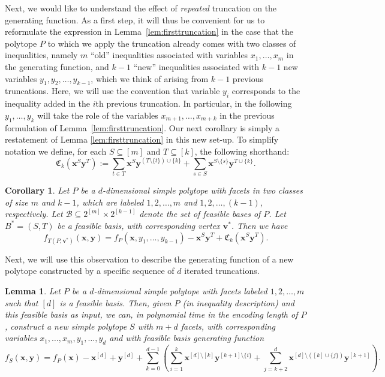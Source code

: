 \documentclass[centering,11pt,reqno]{amsart}
\newtheorem{lem}[theorem]{Lemma}
\newtheorem{cor}[theorem]{Corollary}
\theoremstyle{definition}
\begin{document}
Next, we would like to understand the effect of \emph{repeated} truncation on the generating function. As a first step, it will thus be convenient for us to reformulate the expression in Lemma~\ref{lem:firsttruncation} in the case that the polytope $P$ to which we apply the truncation already comes with two classes of inequalities, namely $m$ ``old'' inequalities associated with variables $x_1,\ldots,x_m$ in the generating function, and $k-1$ ``new'' inequalities associated with $k-1$ new variables $y_{1}, y_{2}, \dots, y_{k-1}$, which we think of arising from $k-1$ previous truncations. Here, we will use the convention that variable $y_{i}$ corresponds to the inequality added in the $i$th previous truncation. In particular, in the following $y_1,\ldots,y_k$ will take the role of the variables $x_{m+1},\ldots,x_{m+k}$ in the previous formulation of Lemma~\ref{lem:firsttruncation}. Our next corollary is simply a restatement of Lemma \ref{lem:firsttruncation} in this new set-up. To simplify notation we define, for each $S\subseteq [m]$ and $T\subseteq [k]$, the following shorthand: $$\mathfrak{C}_{k}(\mathbf{x}^{S}\mathbf{y}^{T}) :=\sum_{t \in T} \mathbf{x}^{S} \mathbf{y}^{(T \setminus \{t\} )\cup \{k\}}+\sum_{s \in S} \mathbf{x}^{S \setminus \{s\}} \mathbf{y}^{T \cup \{k\}}.$$

\begin{cor}\label{cor:truncateys}
Let $P$ be a $d$-dimensional simple polytope with facets in two classes of size $m$ and $k-1$, which are labeled $1,2,\dots,m$ and $1,2,\dots,(k-1)$, respectively. Let $\mathcal{B} \subseteq 2^{[m]} \times 2^{[k-1]}$ denote the set of feasible bases of $P$. Let $B^{\ast} = (S,T)$ be a feasible basis, with corresponding vertex $\mathbf{v}^\ast$. Then we have
\[f_{T(P,\mathbf{v}^\ast)}(\mathbf{x},\mathbf{y}) =  %
f_P(\mathbf{x},y_1,\ldots,y_{k-1})-\mathbf{x}^S\mathbf{y}^T + \mathfrak{C}_k(\mathbf{x}^{S}\mathbf{y}^{T}).\]
\end{cor}

Next, we will use this observation to describe the generating function of a new polytope constructed by a specific sequence of $d$ iterated truncations.

\begin{lem}\label{lem:function}
Let $P$ be a $d$-dimensional simple polytope with facets labeled $1, 2,\dots, m$ such that $[d]$ is a feasible basis. Then, given $P$ (in inequality description) and this feasible basis as input, we can, in polynomial time in the encoding length of $P$, construct a new simple polytope $S$ with $m + d$ facets, with corresponding variables $x_1,\ldots,x_m,y_1,\ldots,y_d$ and with feasible basis generating function 
\[f_{S}(\mathbf{x}, \mathbf{y}) = f_{P}(\mathbf{x}) - \mathbf{x}^{[d]} + \mathbf{y}^{[d]} + \sum_{k=0}^{d-1} \left(\sum_{i=1}^{k} \mathbf{x}^{[d] \setminus [k]} \mathbf{y}^{[k+1] \setminus \{i\}} + \sum_{j=k+2}^{d} \mathbf{x}^{[d] \setminus ([k] \cup \{j\})} \mathbf{y}^{[k+1]} \right).\] 
\end{lem}
\end{document}

